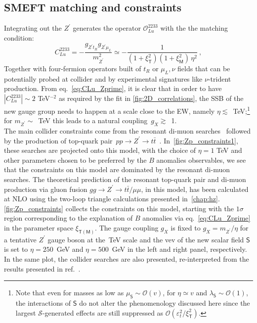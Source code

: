 \subsection{SMEFT matching and constraints}
Integrating out the $Z^{\prime}$ generates the operator $\mathcal O_{L u}^{2233}$ with the the matching condition:
\begin{equation}
	\label{eq:CLu_Zprime}
	C_{L u}^{2233} = - \frac{g_{Z^{\prime} t_{R} } g_{Z^{\prime} \mu_{L}} }{m_{Z^{\prime}}^2} \simeq - \frac{1}{(1+ \xi^2_{\mathsf{T}})(1+ \xi^2_{\mathsf{M}}) \, \eta^{2}} \ ,
\end{equation}
%
Together with four-fermion operators built of $t_{R}$ or $\mu_{L},\nu$  fields that can be potentially probed at collider and by experimental signatures like $\nu$-trident production. 
From eq.~\eqref{eq:CLu_Zprime}, it is clear that in order to have $|C_{L u}^{2233}| \sim 2 $ TeV$^{-2}$ as required  by the fit in \autoref{fig:2D_correlations}, the SSB of the new gauge group needs to happen at a scale close to the EW, namely $\eta \lesssim$~TeV;\footnote{Note that even for masses as low as $\mu_{\mathsf{S}} \sim \mathcal{O}(v)$, for $\eta \simeq v$ and $\lambda_{\mathsf{S}} \sim \mathcal{O}(1)$, the interactions of $\mathsf{S}$ do not alter the phenomenology discussed here since the largest $\mathcal{S}$-generated effects are still suppressed as $\mathcal{O}(\varepsilon_{t}^2/\xi^2_{\mathsf{T}})$.} for $m_{Z^{\prime}} \sim$~TeV this leads to a natural coupling~$g_{X} \gtrsim$~1. \\ The main collider constraints come from the resonant di-muon searches~\cite{ATLAS-CONF-2019-001} followed by the production of top-quark pair~$ pp \to Z^\prime \to t \bar t$~\cite{ATLAS:2019npw}. In~\autoref{fig:Zp_constraints1}, these searches are projected onto this model, with the choice of $\eta=1$ TeV and other parameters chosen to be preferred by the $B$ anomalies observables, we see that the constraints on this model are dominated by the resonant di-muon searches. The theoretical prediction of the resonant top-quark pair and di-muon production via gluon fusion $ gg \to Z^\prime \to t \bar t /\mu \mu$, in this model, has been calculated at NLO using the two-loop triangle calculations presented in~\autoref{chap:hz}. \\
 \autoref{fig:Zp_constraints} collects the constraints on this model, starting with the $1\sigma$ region corresponding to the explanation of $B$ anomalies via eq.~\eqref{eq:CLu_Zprime} in the parameter space $\xi_{\mathsf{T(M)}}$. The gauge coupling $g_X$ is fixed to $g_{X} = m_{Z^{\prime}}/\eta$ for a tentative $Z^{\prime}$ gauge boson at the~TeV scale and the vev of the new scalar field $\mathsf{S}$ is set to $\eta = 250$~GeV and $\eta = 500$~GeV  in the left and right panel, respectively. In the same plot, the collider searches are also presented, re-interpreted from the results presented in ref.~\cite{Camargo-Molina:2018cwu}. \\

